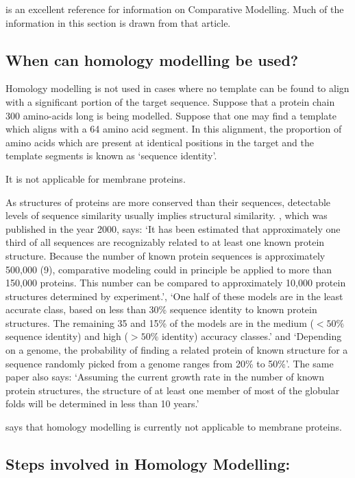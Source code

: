 \documentclass[10pt]{report}
\begin{document}
\cite{marti-renom2000com} is an excellent reference for information on Comparative Modelling. Much of the information in this section is drawn from that article.

\subsection{When can homology modelling be used?}

Homology modelling is not used in cases where no template can be found to align with a significant portion of the target sequence. \cite{baker01} Suppose that a protein chain 300 amino-acids long is being modelled. Suppose that one may find a template which aligns with a 64 amino acid segment. In this alignment, the proportion of amino acids which are present at identical positions in the target and the template segments is known as `sequence identity'.

It is not applicable for membrane proteins.

As structures of proteins are more conserved than their sequences, detectable levels of sequence similarity usually implies structural similarity. \cite{marti-renom2000com}, which was published in the year 2000, says: `It has been estimated that approximately one third of all sequences are recognizably related to at least one known protein structure. Because the number of known protein sequences is approximately 500,000 (9), comparative modeling could in principle be applied to more than 150,000 proteins. This number can be compared to approximately 10,000 protein structures determined by experiment.', `One half of these models are in the least accurate class, based on less than 30\% sequence identity to known protein structures. The remaining 35 and 15\% of the models are in the medium ($<50\%$ sequence identity) and high ($>50\%$ identity) accuracy classes.' and `Depending on a genome, the probability of finding a related protein of known structure for a sequence randomly picked from a genome ranges from 20\% to 50\%'. The same paper also says: `Assuming the current growth rate in the number of known protein structures, the structure of at least one member of most of the globular folds will be determined in less than 10 years.'

\cite{marti-renom2000com} says that homology modelling is currently not applicable to membrane proteins.

\subsection{Steps involved in Homology Modelling:}
\end{document}
